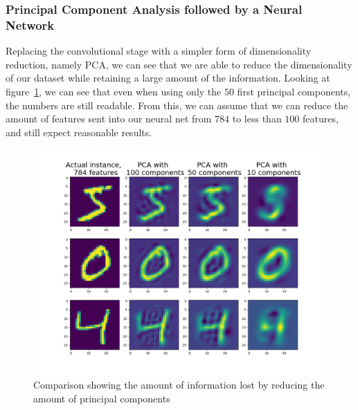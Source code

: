 \documentclass[onecolumn,10pt,cleanfoot]{asme2ej}
\begin{document}
\subsubsection{Principal Component Analysis followed by a Neural Network}

Replacing the convolutional stage with a simpler form of dimensionality reduction, namely PCA, we can see that we are able to reduce the dimensionality of our dataset while retaining a large amount of the information. Looking at figure~\ref{pcacomp}, we can see that even when using only the $50$ first principal components, the numbers are still readable. From this, we can assume that we can reduce the amount of features sent into our neural net from $784$ to less than $100$ features, and still expect reasonable results.

\begin{figure}[H]
\centerline{\includegraphics[width=5in]{figure/pcacomp.png}}
\caption{Comparison showing the amount of information lost by reducing the amount of principal components}
\label{pcacomp}
\end{figure}
\end{document}
